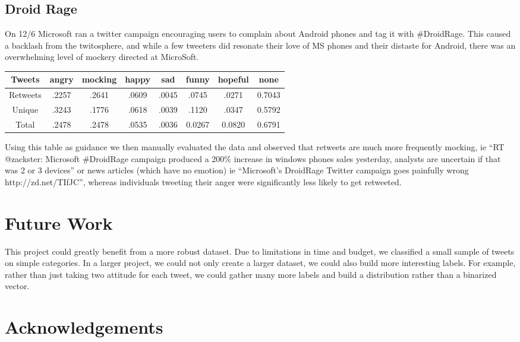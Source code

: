 \documentclass[11pt]{article}
\begin{document}
\subsection{Droid Rage}

On 12/6 Microsoft ran a twitter campaign encouraging users to complain about Android phones and tag it with \#DroidRage. This caused a backlash from the twitosphere, and while a few tweeters did resonate their love of MS phones and their distaste for Android, there was an overwhelming level of mockery directed at MicroSoft.

\begin{center}
\begin{tabular}{|c|c|c|c|c|c|c|c|}
\hline
Tweets & angry & mocking & happy & sad & funny & hopeful & none \tabularnewline
\hline
Retweets & .2257 & .2641 & .0609 & .0045 & .0745 & .0271 & 0.7043 \tabularnewline
\hline
Unique & .3243 & .1776 & .0618 & .0039 & .1120 & .0347 & 0.5792 \tabularnewline
\hline
Total & .2478 & .2478 & .0535 & .0036 & 0.0267 & 0.0820 & 0.6791\tabularnewline
\hline
\end{tabular}
\end{center}

Using this table as guidance we then manually evaluated the data and observed that retweets are much more frequently mocking, ie ``RT @zackster: Microsoft \#DroidRage campaign produced a 200\% increase in windows phones sales yesterday, analysts are uncertain if that was 2 or 3 devices'' or news articles (which have no emotion) ie ``Microsoft's DroidRage Twitter campaign goes painfully wrong http://zd.net/TIfJC'', whereas individuals tweeting their anger were significantly less likely to get retweeted.

\section{Future Work}

This project could greatly benefit from a more robust dataset. Due to limitations in time and budget, we classified a small sample of tweets on simple categories. In a larger project, we could not only create a larger dataset, we could also build more interesting labels. For example, rather than just taking two attitude for each tweet, we could gather many more labels and build a distribution rather than a binarized vector.

\section{Acknowledgements}
\end{document}
